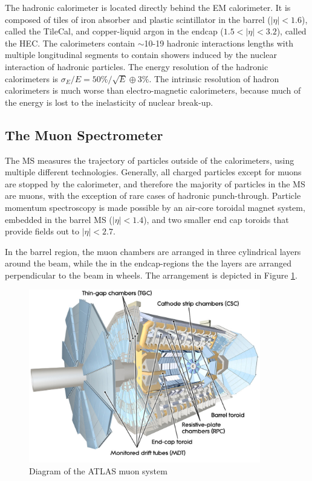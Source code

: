 The hadronic calorimeter is located directly behind the EM calorimeter. It is composed of tiles of iron absorber and plastic scintillator  in the barrel ($|\eta| < 1.6$), called the TileCal,  and copper-liquid argon in the endcap ($1.5<|\eta| <3.2$), called the HEC. The calorimeters contain $\sim$10-19 hadronic interactions lengths with multiple longitudinal segments to contain showers induced by the nuclear interaction of hadronic particles. The energy resolution of the hadronic calorimeters is $\sigma_E/E = 50\%/\sqrt{E}\oplus3\%$. The intrinsic resolution of hadron calorimeters is much worse than electro-magnetic calorimeters, because much of the energy is lost to the inelasticity of nuclear break-up. 

\subsection{The Muon Spectrometer} 

The MS measures the trajectory of particles outside of the calorimeters, using multiple different technologies. Generally, all charged particles except for muons are stopped by the calorimeter, and therefore the majority of particles in the MS are muons, with the exception of rare cases of hadronic punch-through. Particle momentum spectroscopy is made possible by an air-core toroidal magnet system, embedded in the barrel MS ($|\eta| < 1.4$), and two smaller end cap toroids that provide fields out to $|\eta| < 2.7$. 

In the barrel region, the muon chambers are arranged in three cylindrical layers around the beam, while the in the endcap-regions the the layers are arranged perpendicular to the beam in wheels. The arrangement is depicted in Figure \ref{figure:lhc_muon}.

\begin{figure}
\centering 
\includegraphics[width=0.9\textwidth]{figs/lhc/MuonSystem-eps-converted-to}
\caption{Diagram of the ATLAS muon system}
\label{figure:lhc_muon}
\end{figure}


